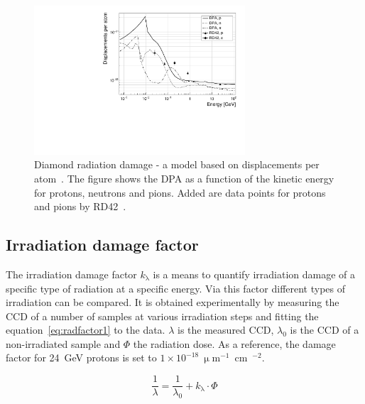 \begin{figure}[!t]
\begin{center}
\includegraphics[width=0.7\textwidth]{03_measurement_results/scripts/plots/dpa1}
\caption{Diamond radiation damage - a model based on displacements per atom~\cite{Guthoff:2014223}. The figure shows the DPA as a function of the kinetic energy for protons, neutrons and pions. Added are data points for protons and pions by RD42~\cite{RD42IRRAD:00000}. %
}
\label{fig:kitdpa}
\end{center}
\end{figure}

\subsection{Irradiation damage factor}
The irradiation damage factor $k_\uplambda$ is a means to quantify irradiation damage of a specific type of radiation at a specific energy. Via this factor different types of irradiation can be compared. It is obtained experimentally by measuring the CCD of a number of samples at various irradiation steps and fitting the equation~\ref{eq:radfactor1} to the data. $\lambda$ is the measured CCD, $\lambda_\mathrm{0}$ is the CCD of a non-irradiated sample and $\Phi$ the radiation dose. As a reference, the damage factor for 24~GeV protons is set to $1\times10^{-18}~\upmu$m$^{-1}$~cm~$^{-2}$.


\begin{equation}
\label{eq:radfactor1}
\frac{1}{\lambda} = \frac{1}{\lambda_\mathrm{0}}+k_\uplambda\cdot\Phi
\end{equation} 





